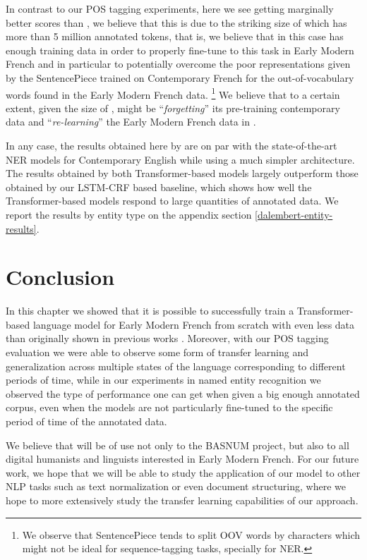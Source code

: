 In contrast to our POS tagging experiments, here we see \dalembert getting marginally better scores than \dalembert, we believe that this is due to the striking size of \freemner which has more than 5 million annotated tokens, that is, we believe that in this case \camembert has enough training data in order to properly fine-tune to this task in Early Modern French and in particular to potentially overcome the poor representations given by the SentencePiece \citep{kudo-richardson-2018-sentencepiece} trained on Contemporary French for the out-of-vocabulary words found in the Early Modern French data. \footnote{We observe that SentencePiece tends to split OOV words by characters which might not be ideal for sequence-tagging tasks, specially for NER.} We believe that to a certain extent, given the size of \freemner, \camembert might be \enquote{\emph{forgetting}} its pre-training contemporary data and \enquote{\emph{re-learning}} the Early Modern French data in \freemner.

In any case, the results obtained here by \dalembert are on par with the state-of-the-art NER models for Contemporary English \citep{wang-etal-2021-automated} while using a much simpler architecture. The results obtained by both Transformer-based models largely outperform those obtained by our LSTM-CRF based baseline, which shows how well the Transformer-based models respond to large quantities of annotated data. We report the results by entity type on the appendix section \ref{dalembert-entity-results}.

\section{Conclusion}

In this chapter we showed that it is possible to successfully train a Transformer-based language model for Early Modern French from scratch with even less data than originally shown in previous works \citep{martin-etal-2020-camembert}. Moreover, with our POS tagging evaluation we were able to observe some form of transfer learning and generalization across multiple states of the language corresponding to different periods of time, while in our experiments in named entity recognition we observed the type of performance one can get when given a big enough annotated corpus, even when the models are not particularly fine-tuned to the specific period of time of the annotated data.

We believe that \dalembert will be of use not only to the BASNUM project, but also to all digital humanists and linguists interested in Early Modern French. For our future work, we hope that we will be able to study the application of our \dalembert model to other NLP tasks such as text normalization or even document structuring, where we hope to more extensively study the transfer learning capabilities of our approach.

